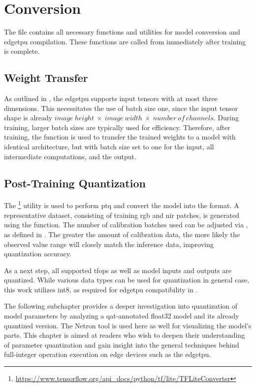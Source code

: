 {\section{Conversion}
\label{sec:conversion}

The file  contains all necessary functions and utilities for model conversion and \gls{edgetpu} compilation.
These functions are called from  immediately after training is complete.

\subsection{Weight Transfer}

As outlined in , the \gls{edgetpu} supports input tensors with at most three dimensions.
This necessitates the use of batch size one, since the input tensor shape is already \ensuremath{image~height~\times~image~width~\times~number~of~channels}.
During training, larger batch sizes are typically used for efficiency.
Therefore, after training, the function  is used to transfer the trained weights to a model with identical architecture,
but with batch size set to one for the input, all intermediate computations, and the output.

\subsection{Post-Training Quantization}

The \footnote{\url{https://www.tensorflow.org/api_docs/python/tf/lite/TFLiteConverter}} utility is used to perform \gls{ptq} and convert the model into
the  format.
A representative dataset, consisting of training \gls{rgb} and \gls{nir} patches, is generated using the  function.
The number of calibration batches used can be adjusted via , as defined in .
The greater the amount of calibration data, the more likely the observed value range will closely match the inference data, improving quantization accuracy.

As a next step, all supported \glspl{tfop} as well as model inputs and outputs are quantized.
While various data types can be used for quantization in general case,
this work utilizes \gls{int8}, as required for \gls{edgetpu} compatibility in .

The following subchapter provides a deeper investigation into quantization of model parameters by analyzing a \gls{qat}-annotated \gls{float32} model and its already quantized version.
The Netron tool is used here as well for visualizing the model's parts.
This chapter is aimed at readers who wish to deepen their understanding of parameter quantization and gain insight into the general techniques
behind full-integer operation execution on edge devices such as the \gls{edgetpu}.

}
